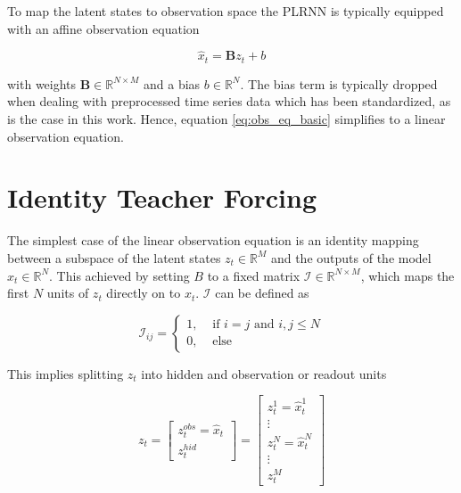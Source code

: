 To map the latent states to observation space the PLRNN is typically equipped with an affine observation equation

\begin{equation}
    \hat{x}_t = \boldsymbol{B} z_t + b
    \label{eq:obs_eq_basic}
\end{equation}

with weights $\boldsymbol{B} \in \mathbb{R}^{N \times M}$ and a bias $b \in \mathbb{R}^N$. The bias term is typically dropped when dealing with preprocessed time series data
which has been standardized, as is the case in this work. Hence, equation \ref{eq:obs_eq_basic} simplifies to a linear observation equation.

\section{Identity Teacher Forcing}

The simplest case of the linear observation equation is an identity mapping between a subspace of the latent states $z_t \in \mathbb{R}^M$ and the outputs of the model 
$\hat{x}_t \in \mathbb{R}^N$. This achieved by setting $B$ to a fixed matrix $\mathcal{I} \in \mathbb{R}^{N \times M}$, which maps the first $N$ units of $z_t$ directly 
on to $x_t$. $\mathcal{I}$ can be defined as 

\begin{equation}
    \mathcal{I}_{ij} = \begin{cases}
        1, & \text{ if } i=j \text{ and } i,j \leq N \\
        0, & \text{ else }
    \end{cases}
\end{equation}

This implies splitting $z_t$ into hidden and observation or readout units 

\begin{equation}
    z_t = \begin{bmatrix}
        z_t^{obs} = \hat{x}_t \\
        z_t^{hid}
    \end{bmatrix} = \begin{bmatrix}
        z_t^1 = \hat{x}_t^1 \\ 
        \vdots \\
        z_t^N = \hat{x}_t^N \\
        \vdots \\
        z_t^M
    \end{bmatrix}
\end{equation}

